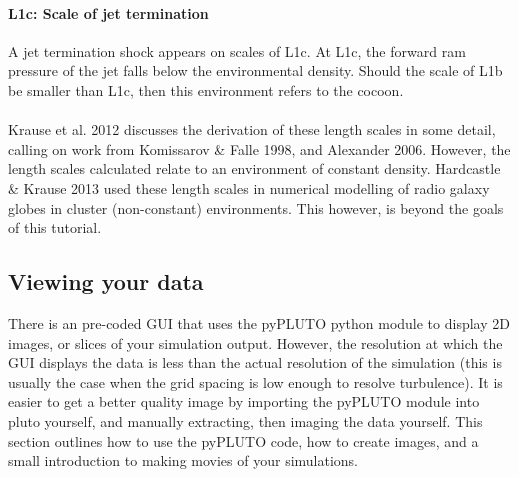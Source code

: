 \documentclass[12pt]{article}
\begin{document}
\paragraph{L1c: Scale of jet termination}
A jet termination shock appears on scales of L1c. At L1c, the forward ram pressure of the jet falls below the environmental density. Should the scale of L1b be smaller than L1c, then this environment refers to the cocoon.\\
\\
Krause et al. 2012 discusses the derivation of these length scales in some detail, calling on work from Komissarov \& Falle 1998, and Alexander 2006. However, the length scales calculated relate to an environment of constant density. Hardcastle \& Krause 2013 used these length scales in numerical modelling of radio galaxy globes in cluster (non-constant) environments. This however, is beyond the goals of this tutorial.

\subsection{Viewing your data}
There is an pre-coded GUI that uses the pyPLUTO python module to display 2D images, or slices of your simulation output. However, the resolution at which the GUI displays the data is less than the actual resolution of the simulation (this is usually the case when the grid spacing is low enough to resolve turbulence). It is easier to get a better quality image by importing the pyPLUTO module into pluto yourself, and manually extracting, then imaging the data yourself. This section outlines how to use the pyPLUTO code, how to create images, and a small introduction to making movies of your simulations.
\end{document}
